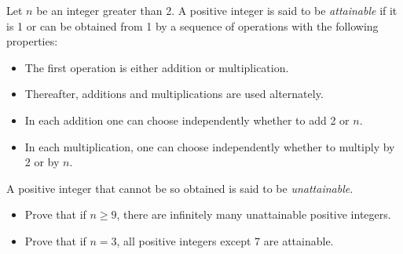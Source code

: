 Let $n$ be an integer greater than 2. A positive integer is said to be \emph{attainable} if it is 1 or can be obtained from 1 by a sequence of operations with the following properties:
\begin{itemize}
\item[(i)] The first operation is either addition or multiplication.
\item[(ii)] Thereafter, additions and multiplications are used alternately.
\item[(iii)] In each addition one can choose independently whether to add 2 or $n$.
\item[(iv)] In each multiplication, one can choose independently whether to multiply by 2 or by $n$.
\end{itemize}
A positive integer that cannot be so obtained is said to be \emph{unattainable}.
\begin{itemize}
\item[(a)] Prove that if $n \geq 9$, there are infinitely many unattainable positive integers.
\item[(b)] Prove that if $n = 3$, all positive integers except 7 are attainable.
\end{itemize}
